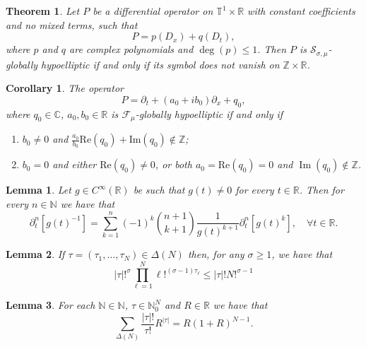 \documentclass[10pt,a4paper]{amsart}
\newtheorem{corollary}{Corollary}
\newtheorem{theorem}{Theorem}
\newtheorem{lemma}{Lemma}
\newcommand{\Imag}{\mathrm{Im}}
\newcommand{\N}{\mathbb{N}}
\newcommand{\R}{\mathbb{R}}
\newcommand{\Real}{\mathrm{Re}}
\newcommand{\T}{\mathbb{T}}
\newcommand{\Z}{\mathbb{Z}}
\begin{document}
\begin{theorem}\label{theo_gh_cte_Nleq1}
    Let $P$ be a differential operator on $\T^1\times\R$ with constant coefficients and no mixed terms, such that  $$P=p\left(D_x\right)+q\left(D_t\right),$$
   where $p$ and $q$ are complex polynomials and $\deg(p)\leq 1$. Then $P$ is $\mathcal{S}_{\sigma,\mu}$-globally hypoelliptic if and only if its symbol does not vanish on $\Z\times \R$.
\end{theorem}

\begin{corollary}\label{coro-tube-cte}
    The operator
    \[P=\partial_t + (a_0+ib_0)\partial_x + q_0,\]
    where $q_0\in\mathbb{C}$, $a_0,b_0\in\R$ is $\mathscr{F}_\mu$-globally hypoelliptic if and only if
    \begin{enumerate}
        \item[(i)] $b_0\neq 0$ and $\frac{a_0}{b_0}\Real(q_0)+\Imag(q_0)\notin\mathbb{Z}$;
        \item[(ii)] $b_0=0$ and either $\Real(q_0)\neq 0$, or both $a_0=\Real(q_0)=0$ and $\operatorname{Im}(q_0)\notin\Z$.
    \end{enumerate}
\end{corollary}

\begin{lemma}\label{derivative-reciprocal}
    Let $g\in C^{\infty}(\R)$ be such that $g(t)\neq 0$ for every $t\in\R$. Then for every $n\in\N$ we have that
    \begin{equation*}
        \partial_t^n [g(t)^{-1}]=\sum_{k=1}^n(-1)^k\binom{n+1}{k+1}\frac{1}{g(t)^{k+1}}\partial_t^n[g(t)^k],\quad \forall t\in\R.
    \end{equation*}
\end{lemma}

\begin{lemma}\label{lemma_algebraic_1}
    If $\tau=(\tau_1,\dots,\tau_N)\in\Delta(N)$ then, for any $\sigma\geq 1$, we have that
    \begin{equation*}
        |\tau|!^{\sigma}\prod_{\ell=1}^{N}\ell!^{(\sigma-1)\tau_{\ell}}\leq |\tau|!N!^{\sigma-1}
    \end{equation*}
\end{lemma}

\begin{lemma}\label{lemma_algebraic_2}
    For each $\N\in\N$, $\tau\in\N_0^N$ and $R\in\R$ we have that
    \begin{equation*}
        \sum_{\Delta(N)}\frac{|\tau|!}{\tau!}R^{|\tau|}=R(1+R)^{N-1}.
    \end{equation*}
\end{lemma}
\end{document}
